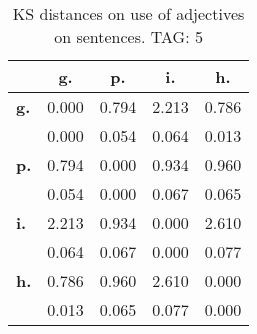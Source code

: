 \begin{table}[h!]
\begin{center}
\begin{tabular}{| l || c | c | c | c |}\hline
 & {\bf g.} & {\bf p.} & {\bf i.} & {\bf h.} \\\hline\hline
{\bf g.} & 0.000 & 0.794 & 2.213 & 0.786 \\
{\bf } & 0.000 & 0.054 & 0.064 & 0.013 \\\hline
{\bf p.} & 0.794 & 0.000 & 0.934 & 0.960 \\
{\bf } & 0.054 & 0.000 & 0.067 & 0.065 \\\hline
{\bf i.} & 2.213 & 0.934 & 0.000 & 2.610 \\
{\bf } & 0.064 & 0.067 & 0.000 & 0.077 \\\hline
{\bf h.} & 0.786 & 0.960 & 2.610 & 0.000 \\
{\bf } & 0.013 & 0.065 & 0.077 & 0.000 \\\hline
\end{tabular}
\caption{KS distances on use of adjectives on sentences. TAG: 5}
\end{center}
\end{table}